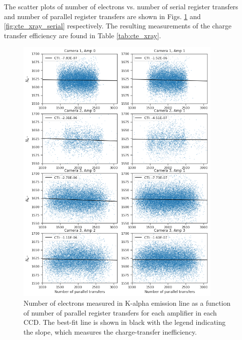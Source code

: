 The scatter plots of number of electrons vs. number of serial register transfers and number of parallel register transfers are shown in Figs. \ref{fig:cte_xray} and \ref{fig:cte_xray_serial} respectively. The resulting measurements of the charge transfer efficiency are found in Table \ref{tab:cte_xray}.

\begin{figure}
    \centering
    \includegraphics[width=0.9\textwidth]{figures/cte/xray_cte_parallel.png}
    \caption{Number of electrons measured in K-alpha emission line as a function of number of parallel register transfers for each amplifier in each CCD. The best-fit line is shown in black with the legend indicating the slope, which measures the charge-transfer inefficiency.}
    \label{fig:cte_xray}
\end{figure}

